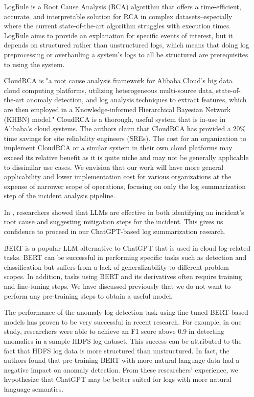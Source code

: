 \documentclass[conference]{IEEEtran}
\begin{document}
LogRule \cite{logrule} is a Root Cause Analysis (RCA) algorithm that offers a time-efficient, accurate, and interpretable solution for RCA in complex datasets--especially where the current state-of-the-art algorithm struggles with execution times. LogRule aims to provide an explanation for specific events of interest, but it depends on structured rather than unstructured logs, which means that doing log preprocessing or overhauling a system's logs to all be structured are prerequisites to using the system.

CloudRCA is "a root cause analysis framework for Alibaba Cloud's big data cloud computing platforms, utilizing heterogeneous multi-source data, state-of-the-art anomaly detection, and log analysis techniques to extract features, which are then employed in a Knowledge-informed Hierarchical Bayesian Network (KHBN) model." \cite{10.1145/3459637.3481903} CloudRCA is a thorough, useful system that is in-use in Alibaba's cloud systems. The authors claim that CloudRCA has provided a 20\% time savings for site reliability engineers (SREs). The cost for an organization to implement CloudRCA or a similar system in their own cloud platforms may exceed its relative benefit as it is quite niche and may not be generally applicable to dissimilar use cases. We envision that our work will have more general applicability and lower implementation cost for various organizations at the expense of narrower scope of operations, focusing on only the log summarization step of the incident analysis pipeline.

In \cite{10172904}, researchers showed that LLMs are effective in both identifying an incident's root cause and suggesting mitigation steps for the incident. This gives us confidence to proceed in our ChatGPT-based log summarization research.

BERT is a popular LLM alternative to ChatGPT that is used in cloud log-related tasks. BERT can be successful in performing specific tasks such as detection and classification but suffers from a lack of generalizability to different problem scopes. In addition, tasks using BERT and its derivatives often require training and fine-tuning steps. We have discussed previously that we do not want to perform any pre-training steps to obtain a useful model.

The performance of the anomaly log detection task using fine-tuned BERT-based models has proven to be very successful in recent research. For example, in one study, researchers were able to achieve an F1 score above 0.9 in detecting anomalies in a sample HDFS log dataset. This success can be attributed to the fact that HDFS log data is more structured than unstructured. In fact, the authors found that pre-training BERT with more natural language data had a negative impact on anomaly detection. \cite{LEE2023110689} From these researchers' experience, we hypothesize that ChatGPT may be better suited for logs with more natural language semantics.
\end{document}
